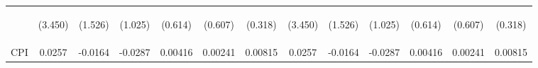 \documentclass[]{article}
\begin{document}
\begin{center}
\begin{tabular}{lcccccccccccc}
\vspace{4pt} & \begin{footnotesize}(3.450)\end{footnotesize} & \begin{footnotesize}(1.526)\end{footnotesize} & \begin{footnotesize}(1.025)\end{footnotesize} & \begin{footnotesize}(0.614)\end{footnotesize} & \begin{footnotesize}(0.607)\end{footnotesize} & \begin{footnotesize}(0.318)\end{footnotesize} & \begin{footnotesize}(3.450)\end{footnotesize} & \begin{footnotesize}(1.526)\end{footnotesize} & \begin{footnotesize}(1.025)\end{footnotesize} & \begin{footnotesize}(0.614)\end{footnotesize} & \begin{footnotesize}(0.607)\end{footnotesize} & \begin{footnotesize}(0.318)\end{footnotesize} \\
CPI & 0.0257 & -0.0164 & -0.0287 & 0.00416 & 0.00241 & 0.00815 & 0.0257 & -0.0164 & -0.0287 & 0.00416 & 0.00241 & 0.00815 \\

\end{tabular}
\end{center}
\end{document}

